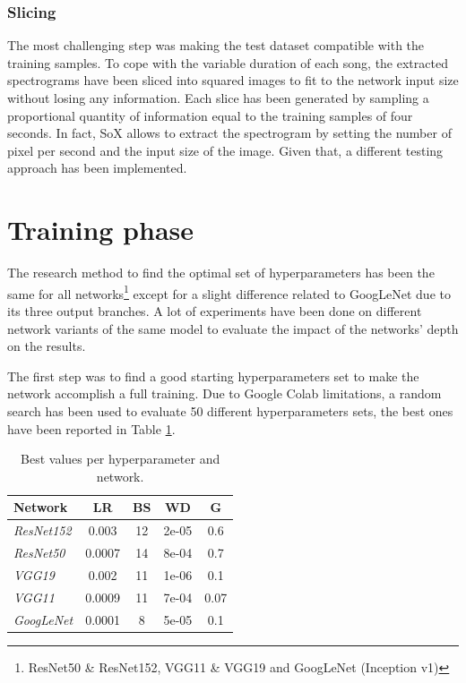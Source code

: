 \documentclass[10pt,twocolumn,letterpaper]{article}
\begin{document}
\subsubsection{Slicing}

The most challenging step was making the test dataset compatible with the training samples. To cope with the variable duration of each song, the extracted spectrograms have been sliced into squared images to fit to the network input size without losing any information. Each slice has been generated by sampling a proportional quantity of information equal to the training samples of four seconds. In fact, SoX allows to extract the spectrogram by setting the number of pixel per second and the input size of the image. Given that, a different testing approach has been implemented.

\section{Training phase}\label{training}

The research method to find the optimal set of hyperparameters has been the same for all networks\footnote {ResNet50 \& ResNet152, VGG11 \& VGG19 and GoogLeNet (Inception v1)} except for a slight difference related to GoogLeNet due to its three output branches. A lot of experiments have been done on different network variants of the same model to evaluate the impact of the networks' depth on the results.

The first step was to find a good starting hyperparameters set to make the network accomplish a full training. Due to Google Colab limitations, a random search has been used to evaluate 50 different hyperparameters sets, the best ones have been reported in Table \ref{tab:sets}.

\begin{table}
   \begin{center}
      \def\arraystretch{1.5}
   \begin{tabular}{l|c|c|c|c}
   \textbf{Network} & \textbf{LR} & \textbf{BS} & \textbf{WD} & \textbf{G} \\
   \hline
   \textit{ResNet152} & 0.003 & 12 & 2e-05 & 0.6 \\
   \hline
   \textit{ResNet50} & 0.0007 & 14 & 8e-04 & 0.7 \\
   \hline
   \textit{VGG19} & 0.002 & 11 & 1e-06 & 0.1 \\
   \hline
   \textit{VGG11} & 0.0009 & 11 & 7e-04 & 0.07 \\
   \hline
   \textit{GoogLeNet} & 0.0001 & 8 & 5e-05 & 0.1 \\
   \end{tabular}
   \end{center}
   \caption{Best values per hyperparameter and network.}
   \label{tab:sets}
   \end{table}
\end{document}
